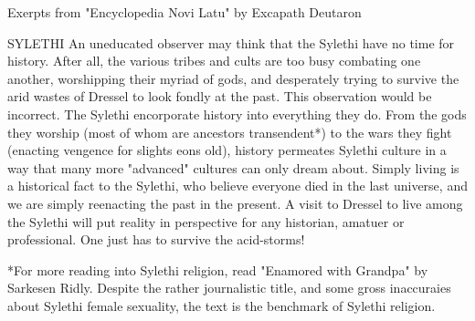 Exerpts from "Encyclopedia Novi Latu" by Excapath Deutaron

SYLETHI
An uneducated observer may think that the Sylethi have no time for history. 
After all, the various tribes and cults are too busy combating one another, worshipping their myriad of gods, and desperately trying to survive the arid wastes of Dressel to look fondly at the past. 
This observation would be incorrect. The Sylethi encorporate history into everything they do. From the gods they worship (most of whom are ancestors transendent*) 
to the wars they fight (enacting vengence for slights eons old), history permeates Sylethi culture in a way that many more "advanced" cultures can only dream about. 
Simply living is a historical fact to the Sylethi, who believe everyone died in the last universe, and we are simply reenacting the past in the present. 
A visit to Dressel to live among the Sylethi will put reality in perspective for any historian, amatuer or professional. One just has to survive the acid-storms!

*For more reading into Sylethi religion, read "Enamored with Grandpa" by Sarkesen Ridly. Despite the rather journalistic title, and some gross inaccuraies about Sylethi female sexuality, the text is the benchmark of Sylethi religion.   

